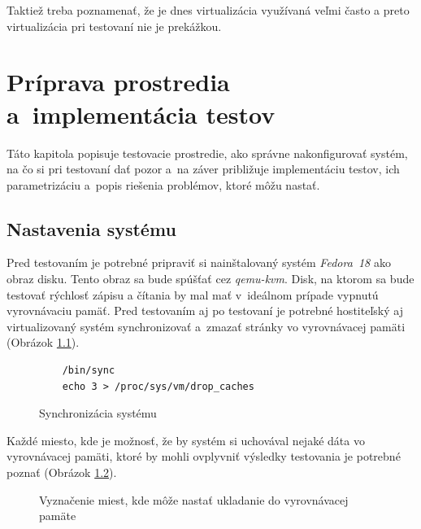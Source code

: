 Taktiež treba poznamenať, že je dnes virtualizácia využívaná veľmi často a
preto virtualizácia pri testovaní nie je prekážkou.

%
%

\chapter{Príprava prostredia a~implementácia testov}

Táto kapitola popisuje testovacie prostredie, ako správne nakonfigurovať
systém, na čo si pri testovaní dať pozor a~na záver približuje implementáciu
testov, ich parametrizáciu a~popis riešenia problémov, ktoré môžu nastať.

\section{Nastavenia systému}

Pred testovaním je potrebné pripraviť si nainštalovaný systém \emph{Fedora~18}
ako obraz disku. Tento obraz sa bude spúšťať cez \emph{qemu-kvm}. Disk, na
ktorom sa bude testovať rýchlosť zápisu a čítania by mal mať v~ideálnom prípade
vypnutú vyrovnávaciu pamäť.  Pred testovaním aj po testovaní je potrebné
hostiteľský aj virtualizovaný systém synchronizovať a~zmazať stránky vo
vyrovnávacej pamäti (Obrázok \ref{alg:sync}).

\begin{figure}[H]
\begin{lstlisting}
    /bin/sync
    echo 3 > /proc/sys/vm/drop_caches
\end{lstlisting}
\caption{Synchronizácia systému}
\label{alg:sync}
\end{figure}

Každé miesto, kde je možnosť, že by systém si uchovával nejaké dáta vo
vyrovnávacej pamäti, ktoré by mohli ovplyvniť výsledky testovania je potrebné
poznať (Obrázok \ref{graf-cache}).

\begin{figure}[H]
\begin{center}
  \caption{Vyznačenie miest, kde môže nastať ukladanie do vyrovnávacej pamäte}
  \label{graf-cache}
\end{center}
\end{figure}

